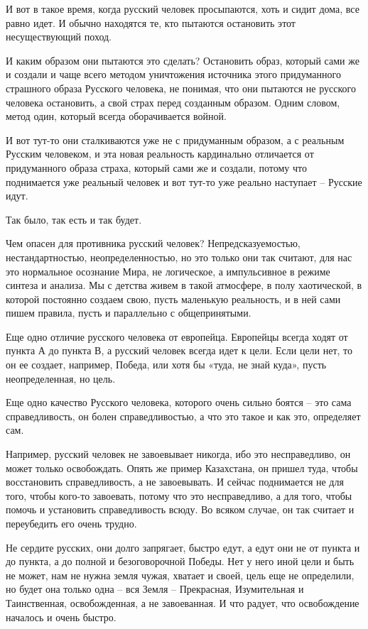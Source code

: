 И вот в такое время, когда русский человек просыпаются, хоть и сидит дома, все
равно идет. И обычно находятся те, кто пытаются остановить этот несуществующий
поход.

И каким образом они пытаются это сделать? Остановить образ, который сами же и
создали и чаще всего методом уничтожения источника этого придуманного страшного
образа Русского человека, не понимая, что они пытаются не русского человека
остановить, а свой страх перед созданным образом. Одним словом, метод один,
который всегда оборачивается войной.

\begin{zznagolos}
И вот тут-то они сталкиваются уже не с придуманным образом, а с реальным
Русским человеком, и эта новая реальность кардинально отличается от
придуманного образа страха, который сами же и создали, потому что поднимается
уже реальный человек и вот тут-то уже реально наступает – Русские идут.	
\end{zznagolos}

Так было, так есть и так будет.

Чем опасен для противника русский человек? Непредсказуемостью,
нестандартностью, неопределенностью, но это только они так считают, для нас это
нормальное осознание Мира, не логическое, а импульсивное в режиме синтеза и
анализа. Мы с детства живем в такой атмосфере, в полу хаотической, в которой
постоянно создаем свою, пусть маленькую реальность, и в ней сами пишем правила,
пусть и параллельно с общепринятыми.

Еще одно отличие русского человека от европейца. Европейцы всегда ходят от
пункта А до пункта В, а русский человек всегда идет к цели. Если цели нет, то
он ее создает, например, Победа, или хотя бы «туда, не знай куда», пусть
неопределенная, но цель.

Еще одно качество Русского человека, которого очень сильно боятся – это сама
справедливость, он болен справедливостью, а что это такое и как это, определяет
сам.

Например, русский человек не завоевывает никогда, ибо это несправедливо, он
может только освобождать. Опять же пример Казахстана, он пришел туда, чтобы
восстановить справедливость, а не завоевывать. И сейчас поднимается не для
того, чтобы кого-то завоевать, потому что это несправедливо, а для того, чтобы
помочь и установить справедливость всюду. Во всяком случае, он так считает и
переубедить его очень трудно.

\begin{zznagolos}
Не сердите русских, они долго запрягает, быстро едут, а едут они не от пункта и
до пункта, а до полной и безоговорочной Победы. Нет у него иной цели и быть не
может, нам не нужна земля чужая, хватает и своей, цель еще не определили, но
будет она только одна – вся Земля – Прекрасная, Изумительная и Таинственная,
освобожденная, а не завоеванная. И что радует, что освобождение началось и
очень быстро.	
\end{zznagolos}

